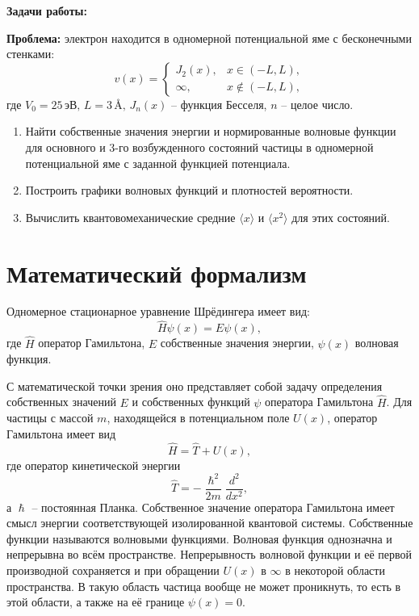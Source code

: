 \documentclass[a4paper,12pt]{article}
\begin{document}
\textbf{Задачи работы:}

\textbf{Проблема:} электрон находится в одномерной потенциальной яме с бесконечными стенками:
\[
v(x) =
\begin{cases}
J_2(x), & x \in (-L, L), \\
\infty, & x \notin (-L, L),
\end{cases}
\]
где \( V_0 = 25 \,\text{эВ}, \, L = 3 \,\text{\AA}, \, J_n(x) \) -- функция Бесселя, \( n \) -- целое число.

\begin{enumerate}
    \item Найти собственные значения энергии и нормированные волновые функции для основного и 3-го возбужденного состояний частицы в одномерной потенциальной яме с заданной функцией потенциала.
    \item Построить графики волновых функций и плотностей вероятности.
    \item Вычислить квантовомеханические средние $\langle x \rangle$ и $\langle x^2 \rangle$ для этих состояний.
\end{enumerate}

\section{Математический формализм}
Одномерное стационарное уравнение Шрёдингера имеет вид:
\begin{equation}
    \hat{H}\psi(x) = E\psi(x),
\end{equation}
где $\hat{H}$ \textendash{} оператор Гамильтона, $E$ \textendash{} собственные значения энергии, $\psi(x)$ \textendash{} волновая функция.

С математической точки зрения оно представляет собой задачу определения собственных значений $E$ и собственных функций $\psi$ оператора Гамильтона $\hat{H}$. Для частицы с массой $m$, находящейся в потенциальном поле $U(x)$, оператор Гамильтона имеет вид
\begin{equation}
    \hat{H} = \hat{T} + U(x),
\end{equation}
где оператор кинетической энергии
\begin{equation}
    \hat{T} = -\frac{\hslash^2}{2m}\frac{d^2}{dx^2},
\end{equation}
а $\hslash$ -- постоянная Планка. Собственное значение оператора Гамильтона имеет смысл энергии соответствующей изолированной квантовой системы. Собственные функции называются волновыми функциями. Волновая функция однозначна и непрерывна во всём пространстве. Непрерывность волновой функции и её первой производной сохраняется и при обращении $U(x)$ в $\infty$ в некоторой области пространства. В такую область частица вообще не может проникнуть, то есть в этой области, а также на её границе $\psi(x)=0$.
\end{document}

